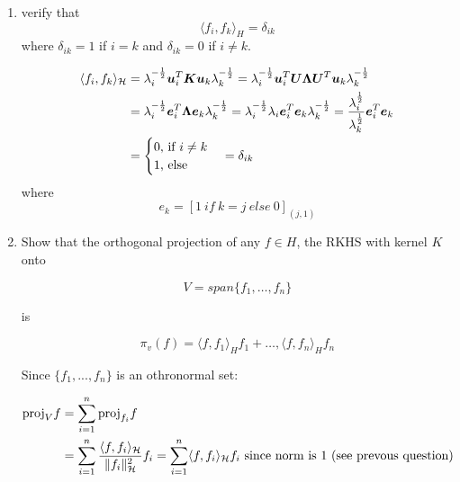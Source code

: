 \documentclass{article}
\begin{document}
\begin{enumerate}

    \item verify that \[\langle f_i,f_k \rangle_H=\delta_{ik}\]
    where $\delta_{ik}=1$ if $i=k$ and $\delta_{ik}=0$ if $i \not = k$. 

    \begin{equation} 
        \begin{aligned}
            \langle f_i, f_k \rangle_{\mathcal{H}} &= \lambda^{-\frac{1}{2}}_i \bm{u}_i^T\bm{K}\bm{u}_k \lambda_k^{-\frac{1}{2}} \notag 
            = \lambda^{-\frac{1}{2}}_i \bm{u}_i^T\bm{U \Lambda U}^T\bm{u}_k \lambda_k^{-\frac{1}{2}} \\
            &= \lambda^{-\frac{1}{2}}_i \bm{e}_i^T\bm{\Lambda}\bm{e}_k \lambda_k^{-\frac{1}{2}} 
            = \lambda^{-\frac{1}{2}}_i \lambda_i\bm{e}_i^T\bm{e}_k \lambda_k^{-\frac{1}{2}} 
            = \frac{\lambda^{\frac{1}{2}}_i}{\lambda_k^{\frac{1}{2}}} \bm{e}_i^T\bm{e}_k \\
            &= 
                \begin{cases} 
                    0 \mbox{, if $i \ne k$} \\
                    1 \mbox{, else}
                \end{cases} 
            = \delta_{ik}
        \end{aligned}
    \end{equation}
    where \[e_k = [1\ if\ k=j\ else\ 0]_{(j,1)}\]
    
    \item Show that the orthogonal projection of any $f \in H$, the RKHS with kernel $K$ onto 
        
        \[V=span\{f_1,\ldots,f_n\}\]

        is

        \[\pi_v(f)=\langle f,f_1\rangle_H f_1+\ldots,\langle f,f_n\rangle_H f_n\]

        Since $\{f_1, ..., f_n\}$ is an othronormal set: 

        \begin{equation} 
            \begin{aligned}
                \mbox{proj}_Vf &= \sum_{i=1}^n \mbox{proj}_{f_i} f \notag \\
                &= \sum_{i=1}^n \frac{\langle f, f_i\rangle_\mathcal{H}}{\|f_i\|^2_\mathcal{H}} f_i
                = \sum_{i=1}^n \langle f, f_i\rangle_\mathcal{H} f_i \mbox{ since norm is 1 (see prevous question)}
            \end{aligned}
        \end{equation}



\end{enumerate}
\end{document}
